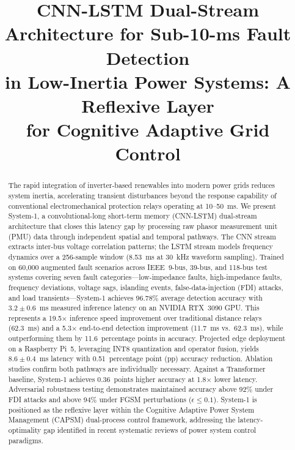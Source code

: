 \documentclass[journal]{IEEEtran}
\begin{document}
\title{CNN-LSTM Dual-Stream Architecture for Sub-10-ms Fault Detection\\ in Low-Inertia Power Systems: A Reflexive Layer\\ for Cognitive Adaptive Grid Control}

\author{
}


\maketitle

\begin{abstract}
The rapid integration of inverter-based renewables into modern power grids reduces system inertia, accelerating transient disturbances beyond the response capability of conventional electromechanical protection relays operating at 10--50~ms. We present System-1, a convolutional-long short-term memory (CNN-LSTM) dual-stream architecture that closes this latency gap by processing raw phasor measurement unit (PMU) data through independent spatial and temporal pathways. The CNN stream extracts inter-bus voltage correlation patterns; the LSTM stream models frequency dynamics over a 256-sample window (8.53~ms at 30~kHz waveform sampling). Trained on 60,000 augmented fault scenarios across IEEE~9-bus, 39-bus, and 118-bus test systems covering seven fault categories---low-impedance faults, high-impedance faults, frequency deviations, voltage sags, islanding events, false-data-injection (FDI) attacks, and load transients---System-1 achieves 96.78\% average detection accuracy with $3.2 \pm 0.6$~ms measured inference latency on an NVIDIA RTX~3090 GPU. This represents a 19.5$\times$ inference speed improvement over traditional distance relays (62.3~ms) and a 5.3$\times$ end-to-end detection improvement (11.7~ms vs.\ 62.3~ms), while outperforming them by 11.6~percentage points in accuracy. Projected edge deployment on a Raspberry Pi~5, leveraging INT8 quantization and operator fusion, yields $8.6 \pm 0.4$~ms latency with 0.51~percentage point (pp) accuracy reduction. Ablation studies confirm both pathways are individually necessary. Against a Transformer baseline, System-1 achieves 0.36~points higher accuracy at 1.8$\times$ lower latency. Adversarial robustness testing demonstrates maintained accuracy above 92\% under FDI attacks and above 94\% under FGSM perturbations ($\epsilon \leq 0.1$). System-1 is positioned as the reflexive layer within the Cognitive Adaptive Power System Management (CAPSM) dual-process control framework, addressing the latency-optimality gap identified in recent systematic reviews of power system control paradigms.
\end{abstract}
\end{document}
